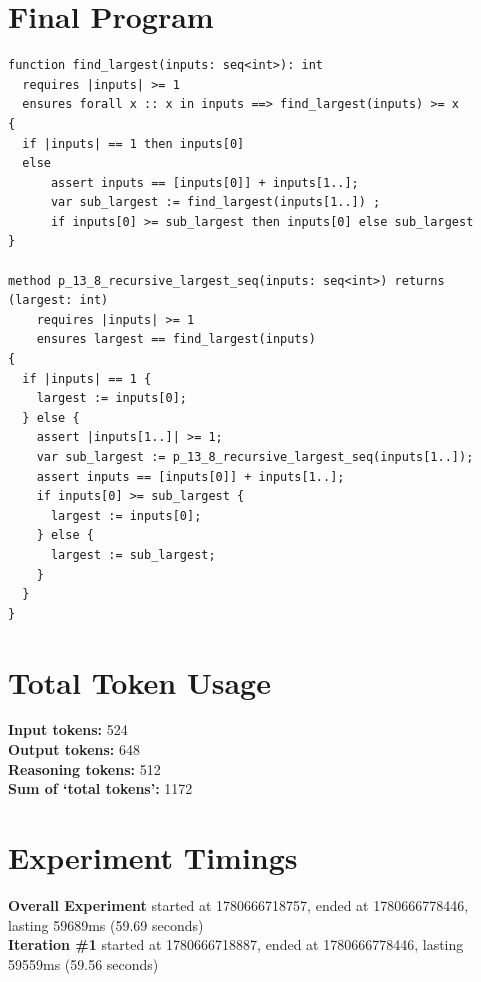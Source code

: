\documentclass{article}
\begin{document}
\section*{Final Program}
\begin{lstlisting}
function find_largest(inputs: seq<int>): int
  requires |inputs| >= 1
  ensures forall x :: x in inputs ==> find_largest(inputs) >= x
{
  if |inputs| == 1 then inputs[0]
  else 
      assert inputs == [inputs[0]] + inputs[1..];
      var sub_largest := find_largest(inputs[1..]) ;
      if inputs[0] >= sub_largest then inputs[0] else sub_largest
}

method p_13_8_recursive_largest_seq(inputs: seq<int>) returns (largest: int)
	requires |inputs| >= 1
	ensures largest == find_largest(inputs)
{
  if |inputs| == 1 {
    largest := inputs[0];
  } else {
    assert |inputs[1..]| >= 1;
    var sub_largest := p_13_8_recursive_largest_seq(inputs[1..]);
    assert inputs == [inputs[0]] + inputs[1..];
    if inputs[0] >= sub_largest {
      largest := inputs[0];
    } else {
      largest := sub_largest;
    }
  }
}
\end{lstlisting}
\section*{Total Token Usage}
\textbf{Input tokens: }524
\\\textbf{Output tokens: }648
\\\textbf{Reasoning tokens: }512
\\\textbf{Sum of `total tokens': }1172
\section*{Experiment Timings}
\textbf{Overall Experiment} started at 1780666718757, ended at 1780666778446, lasting 59689ms (59.69 seconds)
\\\textbf{Iteration \#1} started at 1780666718887, ended at 1780666778446, lasting 59559ms (59.56 seconds)
\end{document}
